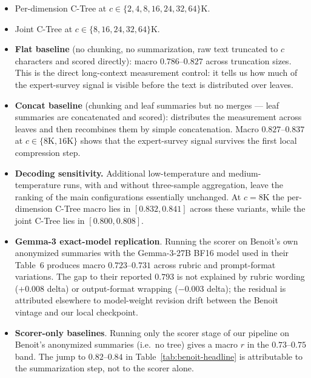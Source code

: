 \begin{itemize}[leftmargin=1.5em]
    \item Per-dimension C-Tree at $c\in\{2,4,8,16,24,32,64\}\text{K}$.
    \item Joint C-Tree at $c\in\{8,16,24,32,64\}\text{K}$.
    \item \textbf{Flat baseline} (no chunking, no summarization, raw
          text truncated to $c$ characters and scored directly): macro
          $0.786$--$0.827$ across truncation sizes. This is the direct
          long-context measurement control: it tells us how much of the
          expert-survey signal is visible before the text is distributed
          over leaves.
    \item \textbf{Concat baseline} (chunking and leaf summaries but no
          merges --- leaf summaries are concatenated and scored):
          distributes the measurement across leaves and then recombines
          them by simple concatenation. Macro $0.827$--$0.837$ at
          $c\in\{8\mathrm{K},16\mathrm{K}\}$ shows that the expert-survey
          signal survives the first local compression step.
    \item \textbf{Decoding sensitivity.} Additional low-temperature and
          medium-temperature runs, with and without three-sample
          aggregation, leave the ranking of the main configurations
          essentially unchanged. At $c = 8\mathrm{K}$ the per-dimension
          C-Tree macro lies in $[0.832,0.841]$ across these variants,
          while the joint C-Tree lies in $[0.800,0.808]$.
    \item \textbf{Gemma-3 exact-model replication}. Running the
          scorer on Benoit's own anonymized summaries with the
          Gemma-3-27B BF16 model used in their Table~6 produces macro
          $0.723$--$0.731$ across rubric and prompt-format
          variations. The gap to their reported $0.793$ is not
          explained by rubric wording ($+0.008$ delta) or output-format
          wrapping ($-0.003$ delta); the residual is attributed
          elsewhere to model-weight revision drift between the
          Benoit vintage and our local checkpoint.
    \item \textbf{Scorer-only baselines}. Running only the scorer
          stage of our pipeline on Benoit's anonymized summaries
          (i.e.\ no tree) gives a macro $r$ in the $0.73$--$0.75$
          band. The jump to $0.82$--$0.84$ in
          Table~\ref{tab:benoit-headline} is attributable to the
          summarization step, not to the scorer alone.
\end{itemize}

